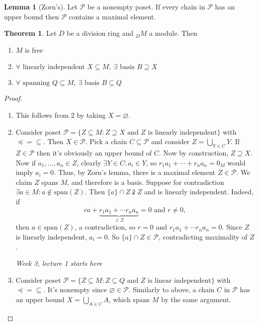 \documentclass[a4paper]{article}
\newcommand{\spa}{\text{span}}
\theoremstyle{definition}
\newtheorem{thm}[defn]{Theorem}
\newtheorem{lemma}[defn]{Lemma}
\begin{document}
\begin{lemma}[Zorn's]
Let $\mathcal P$ be a nonempty poset. If every chain in $\mathcal P$ has an upper bound then $\mathcal P$ contains a maximal element.
\end{lemma}

\begin{thm}
\label{thm:modoverdivringisfree}
Let $D$ be a division ring and $_DM$ a module. Then
\begin{enumerate}
\item $M$ is free
\item $\forall \text{ linearly independent } X\subseteq M,\ \exists \text{ basis }B\supseteq X$
\item $\forall \text{ spanning } Q\subseteq M,\ \exists \text{ basis }B\subseteq Q$
\end{enumerate}
\end{thm}
\begin{proof}
\begin{enumerate}
\item This follows from 2 by taking $X=\varnothing$.
\item Consider poset $\mathcal P=\{Z\subseteq M:Z\supseteq X\text{ and }Z\text{ is linearly independent}\}$ with $\preceq{}={}\subseteq$. Then $X\in\mathcal P$. Pick a chain $C\subseteq\mathcal P$ and consider $Z=\bigcup_{Y\in C}Y$. If $Z\in\mathcal P$ then it's obviously an upper bound of $C$. Now by construction, $Z\supseteq X$. Now if $a_1,\ldots,a_n\in Z$, clearly $\exists Y\in C:a_i\in Y$, so $r_1a_1+\cdots+r_na_n=0_M$ would imply $a_i=0$. Thus, by Zorn's lemma, there is a maximal element $Z\in\mathcal P$. We claim $Z$ spans $M$, and therefore is a basis. Suppose for contradiction $\exists a\in M:a\notin\spa(Z)$. Then $\{a\}\cap Z\supsetneqq Z$ and is linearly independent. Indeed, if
\[
ra+\underbrace{r_1a_1+\cdots r_na_n}_{\in Z}=0\text{ and }r\neq 0,
\]
then $a\in\spa(Z)$, a contradiction, so $r=0$ and $r_1a_1+\cdots r_na_n=0$. Since $Z$ is linearly independent, $a_i=0$. So $\{a\}\cap Z\in\mathcal P$, contradicting maximality of $Z$.

\begin{flushright}
\textit{Week 3, lecture 1 starts here}
\end{flushright}

\item Consider poset $\mathcal P=\{Z\subseteq M:Z\subseteq Q\text{ and }Z\text{ is linear independent}\}$ with $\preceq{}={}\subseteq$. It's nonempty since $\varnothing\in\mathcal P$. Similarly to above, a chain $C$ in $\mathcal P$ has an upper bound $X=\bigcup_{A\in C} A$, which spans $M$ by the same argument.
\end{enumerate}
\end{proof}
\end{document}
